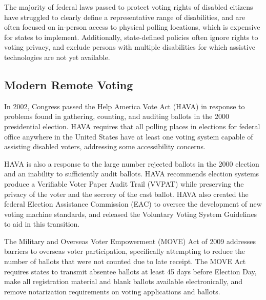 The majority of federal laws passed to protect voting rights of
disabled citizens have struggled to clearly define a representative
range of disabilities, and are often focused on in-person access to
physical polling locations, which is expensive for states to
implement. Additionally, state-defined policies often ignore rights to
voting privacy, and exclude persons with multiple disabilities for
which assistive technologies are not yet available.

\subsection{Modern Remote Voting}

In 2002, Congress passed the Help America Vote Act (HAVA) in response
to problems found in gathering, counting, and auditing ballots in the
2000 presidential election. HAVA requires that all polling places in
elections for federal office anywhere in the United States have at
least one voting system capable of assisting disabled voters,
addressing some accessibility concerns.

HAVA is also a response to the large number rejected ballots in the
2000 election and an inability to sufficiently audit ballots. HAVA
recommends election systems produce a Verifiable Voter Paper Audit
Trail (VVPAT) while preserving the privacy of the voter and the
secrecy of the cast ballot. HAVA also created the federal Election
Assistance Commission (EAC) to oversee the development of new voting
machine standards, and released the Voluntary Voting System Guidelines
to aid in this transition.

The Military and Overseas Voter Empowerment (MOVE) Act of 2009
addresses barriers to overseas voter participation, specifically
attempting to reduce the number of ballots that were not counted due
to late receipt. The MOVE Act requires states to transmit absentee
ballots at least 45 days before Election Day, make all registration
material and blank ballots available electronically, and remove
notarization requirements on voting applications and ballots.



